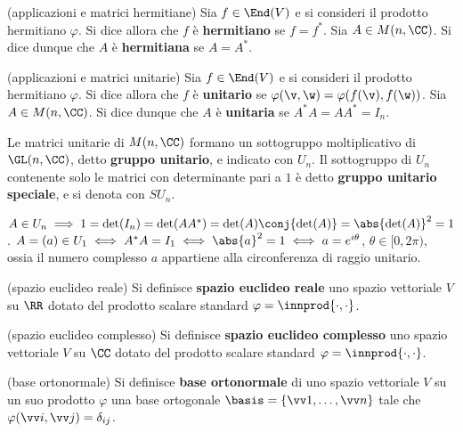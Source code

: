 \documentclass[11pt]{article}
\begin{document}
	\begin{definition} (applicazioni e matrici hermitiane)
		Sia $f \in \End(V)$ e si consideri il prodotto hermitiano $\varphi$. Si dice allora che
		$f$ è \textbf{hermitiano} se $f = f^*$. Sia $A \in M(n, \CC)$. Si dice dunque che $A$
		è \textbf{hermitiana} se $A = A^*$.
	\end{definition}

	\begin{definition} (applicazioni e matrici unitarie)
		Sia $f \in \End(V)$ e si consideri il prodotto hermitiano $\varphi$. Si dice allora che
		$f$ è \textbf{unitario} se $\varphi(\v, \w) = \varphi(f(\v), f(\w))$. Sia $A \in M(n, \CC)$.
		Si dice dunque che $A$ è \textbf{unitaria} se $A^* A = A A^* = I_n$.
	\end{definition}

	\begin{definition}
		Le matrici unitarie di $M(n, \CC)$ formano un sottogruppo moltiplicativo di $\GL(n, \CC)$, detto \textbf{gruppo unitario},
		e indicato con $U_n$. Il sottogruppo di $U_n$ contenente solo le matrici con determinante pari a $1$ è
		detto \textbf{gruppo unitario speciale}, e si denota con $SU_n$.
	\end{definition}

	\begin{remark}\nl		
		\li $A \in U_n \implies 1 = \det(I_n) = \det(A A^*) = \det(A) \conj{\det(A)} = \abs{\det(A)}^2 = 1$.
		\li $A = (a) \in U_1 \iff A^* A = I_1 \iff \abs{a}^2 = 1 \iff a = e^{i\theta}$, $\theta \in [0, 2\pi)$, ossia il numero complesso $a$ appartiene alla circonferenza di raggio unitario.
	\end{remark}

	\begin{definition} (spazio euclideo reale)
		Si definisce \textbf{spazio euclideo reale} uno spazio vettoriale $V$ su $\RR$ dotato
		del prodotto scalare standard $\varphi = \innprod{\cdot, \cdot}$.
	\end{definition}

	\begin{definition} (spazio euclideo complesso)
		Si definisce \textbf{spazio euclideo complesso} uno spazio vettoriale $V$ su $\CC$ dotato
		del prodotto scalare standard $\varphi = \innprod{\cdot, \cdot}$.
	\end{definition}

	\begin{definition} (base ortonormale)
		Si definisce \textbf{base ortonormale} di uno spazio vettoriale $V$ su un suo prodotto $\varphi$
		una base ortogonale $\basis = \{ \vv 1, \ldots, \vv n \}$ tale che $\varphi(\vv i, \vv j) = \delta_{ij}$.
	\end{definition}
\end{document}
